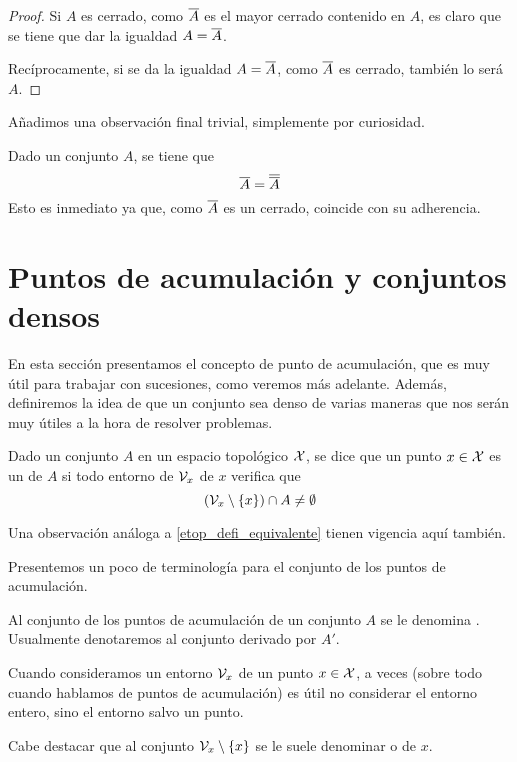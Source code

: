 \begin{proof}
	Si $A$ es cerrado, como $\overline{A}$ es el mayor cerrado contenido en $A$, es claro que se tiene que dar la igualdad $A=\overline{A}$.
	
	Recíprocamente, si se da la igualdad $A=\overline{A}$, como $\overline{A}$ es cerrado, también lo será $A$.
\end{proof}
Añadimos una observación final trivial, simplemente por curiosidad.
\begin{obs}
	Dado un conjunto $A$, se tiene que
	\begin{equation*}
	\overline{A}=\overline{\overline{A}}
	\end{equation*}
	Esto es inmediato ya que, como $\overline{A}$ es un cerrado, coincide con su adherencia.
\end{obs}
\section{Puntos de acumulación y conjuntos densos}
En esta sección presentamos el concepto de punto de acumulación, que es muy útil para trabajar con sucesiones, como veremos más adelante. Además, definiremos la idea de que un conjunto sea denso de varias maneras que nos serán muy útiles a la hora de resolver problemas.
\begin{defi}
	\label{etop_defi_puntoAcumulacion}
	Dado un conjunto $A$ en un espacio topológico $\mathcal{X}$, se dice que un punto $x\in\mathcal{X}$ es un  de $A$ si todo entorno de $\mathcal{V}_x$ de $x$ verifica que
	\begin{equation*}
	(\mathcal{V}_x\setminus\{x\})\cap A\not=\emptyset
	\end{equation*}
\end{defi}
\begin{obs}
	Una observación análoga a \ref{etop_defi_equivalente} tienen vigencia aquí también.
\end{obs}
Presentemos un poco de terminología para el conjunto de los puntos de acumulación.
\begin{defi}
	Al conjunto de los puntos de acumulación de un conjunto $A$ se le denomina . Usualmente denotaremos al conjunto derivado por $A'$.
\end{defi}
\begin{obs}
	Cuando consideramos un entorno $\mathcal{V}_x$ de un punto $x\in\mathcal{X}$, a veces (sobre todo cuando hablamos de puntos de acumulación) es útil no considerar el entorno entero, sino el entorno salvo un punto.
	
	Cabe destacar que al conjunto $\mathcal{V}_x\setminus\{x\}$ se le suele denominar  o  de $x$.
\end{obs}
